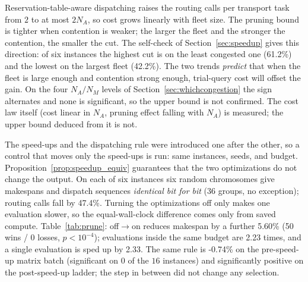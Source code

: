 \documentclass[manuscript,screen,review]{acmart}
\newcommand{\RouteCallCutLo}{42.2\%}     %
\newcommand{\RouteCallCutHi}{61.2\%}     %
\newcommand{\SpeedupProbe}{2.33}
\newcommand{\RouteCallCut}{47.4\%}
\newcommand{\GainPrune}{5.60\%}
\newcommand{\PPrune}{<10^{-4}}
\newcommand{\WinPrune}{50}
\newcommand{\LosePrune}{0}
\newcommand{\EvalRatioPrune}{2.23}
\newcommand{\MatrixCells}{16}
\newcommand{\GainProbePre}{-0.74\%}      %
\begin{document}
Reservation-table-aware dispatching raises the routing calls per transport task from $2$ to at most $2N_A$, so cost grows linearly with fleet size.
The pruning bound is tighter when contention is weaker; the larger the fleet and the stronger the contention, the smaller the cut.
The self-check of Section~\ref{sec:speedup} gives this direction: of six instances the highest cut is on the least congested one (\RouteCallCutHi{}) and the lowest on the largest fleet (\RouteCallCutLo{}).
The two trends \emph{predict} that when the fleet is large enough and contention strong enough, trial-query cost will offset the gain.
On the four $N_A/N_M$ levels of Section~\ref{sec:whichcongestion} the sign alternates and none is significant, so the upper bound is not confirmed.
The cost law itself (cost linear in $N_A$, pruning effect falling with $N_A$) is measured; the upper bound deduced from it is not.

The speed-ups and the dispatching rule were introduced one after the other, so a control that moves only the speed-ups is run: same instances, seeds, and budget.
Proposition~\ref{prop:speedup_equiv} guarantees that the two optimizations do not change the output.
On each of six instances six random chromosomes give makespans and dispatch sequences \emph{identical bit for bit} ($36$ groups, no exception); routing calls fall by \RouteCallCut{}.
Turning the optimizations off only makes one evaluation slower, so the equal-wall-clock difference comes only from saved compute.
Table~\ref{tab:prune}: off$\to$on reduces makespan by a further \GainPrune{} (\WinPrune{} wins / \LosePrune{} losses, $p\PPrune$); evaluations inside the same budget are \EvalRatioPrune{} times, and a single evaluation is sped up by \SpeedupProbe{}.
The same rule is \GainProbePre{} on the pre-speed-up matrix batch (significant on $0$ of the $\MatrixCells$ instances) and significantly positive on the post-speed-up ladder; the step in between did not change any selection.

\begin{table}[t]
\caption{Pruning and winner-path reuse off versus on (bold header: the setting used here).
Output is bit-identical, so the difference is saved compute.
Same instances, seeds, and wall-clock; $n=60$ pairs, two-sided Wilcoxon ($^{***}p<0.001$).
Ratio columns take the off setting as denominator, in opposite directions.}
\label{tab:prune}
\small

\end{table}
\end{document}

